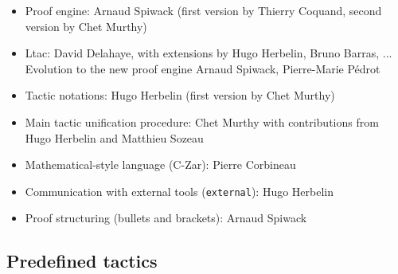 \documentclass{article}
\begin{document}
\begin{itemize}
\item Proof engine: Arnaud Spiwack (first version by Thierry Coquand, second version by Chet Murthy)
\item Ltac: David Delahaye, with extensions by Hugo Herbelin, Bruno Barras, ...
  Evolution to the new proof engine Arnaud Spiwack, Pierre-Marie P\'edrot
\item Tactic notations: Hugo Herbelin (first version by Chet Murthy)
\item Main tactic unification procedure: Chet Murthy with
  contributions from Hugo Herbelin and Matthieu Sozeau
\item Mathematical-style language (C-Zar): Pierre Corbineau
\item Communication with external tools (\texttt{external}): Hugo Herbelin
\item Proof structuring (bullets and brackets): Arnaud Spiwack
\end{itemize}

\subsection{Predefined tactics}
\end{document}
